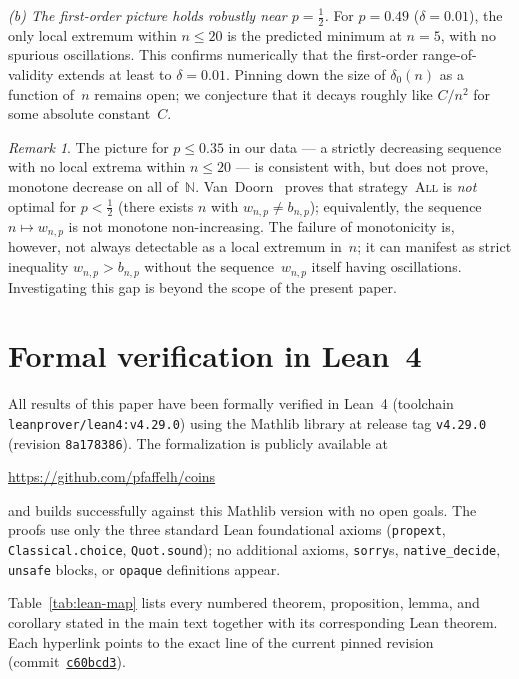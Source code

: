 \documentclass[12pt]{article}
\theoremstyle{definition}
\theoremstyle{remark}
\newtheorem{remark}[theorem]{Remark}
\newcommand{\All}{\textsc{All}}
\begin{document}
\emph{(b) The first-order picture holds robustly near $p=\tfrac12$.}
For $p=0.49$ ($\delta=0.01$), the only local extremum within
$n\le 20$ is the predicted minimum at $n=5$, with no spurious
oscillations.  This confirms numerically that the first-order
range-of-validity extends at least to $\delta=0.01$.  Pinning down
the size of $\delta_0(n)$ as a function of~$n$ remains open; we
conjecture that it decays roughly like $C/n^2$ for some absolute
constant~$C$.

\begin{remark}
  The picture for $p\le 0.35$ in our data --- a strictly
  decreasing sequence with no local extrema within $n\le 20$ ---
  is consistent with, but does not prove, monotone decrease on
  all of~$\mathbb{N}$.  Van~Doorn~\cite{vanDoorn2024} proves that
  strategy~\All{} is \emph{not} optimal for $p<\tfrac12$ (there
  exists $n$ with $w_{n,p}\ne b_{n,p}$); equivalently, the
  sequence $n\mapsto w_{n,p}$ is not monotone non-increasing.
  The failure of monotonicity is, however, not always detectable
  as a local extremum in~$n$; it can manifest as strict inequality
  $w_{n,p}>b_{n,p}$ without the sequence~$w_{n,p}$ itself having
  oscillations.  Investigating this gap is beyond the scope of the
  present paper.
\end{remark}

\appendix

\section{Formal verification in Lean~4}\label{app:lean}

All results of this paper have been formally verified in
Lean~4 (toolchain \texttt{leanprover/lean4:v4.29.0}) using the
Mathlib library at release tag \texttt{v4.29.0} (revision
\texttt{8a178386}).  The formalization is publicly available at
\begin{center}
  \url{https://github.com/pfaffelh/coins}
\end{center}
and builds successfully against this Mathlib version with no open
goals.  The proofs use only the three standard Lean foundational
axioms (\texttt{propext}, \texttt{Classical.choice},
\texttt{Quot.sound}); no additional axioms, \texttt{sorry}s,
\texttt{native\_decide}, \texttt{unsafe} blocks, or
\texttt{opaque} definitions appear.

Table~\ref{tab:lean-map} lists every numbered theorem,
proposition, lemma, and corollary stated in the main text together
with its corresponding Lean theorem.  Each hyperlink points to the
exact line of the current pinned revision
(commit~\href{https://github.com/pfaffelh/coins/tree/c60bcd3}{\texttt{c60bcd3}}).
\end{document}
